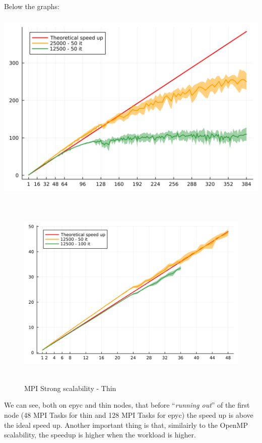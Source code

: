 \documentclass[
  letterpaper,
  DIV=11,
  numbers=noendperiod]{scrartcl}
\begin{document}
Below the graphs:

\includegraphics[width=\textwidth,height=3.64583in]{img/epyc_mpi_sockets.png}
\newpage

\begin{figure}

{\centering \includegraphics[width=\textwidth,height=3.64583in]{img/thin_mpi_sockets.png}

}

\caption{MPI Strong scalability - Thin}

\end{figure}

We can see, both on epyc and thin nodes, that before ``\emph{running
out}'' of the first node (48 MPI Tasks for thin and 128 MPI Tasks for
epyc) the speed up is above the ideal speed up. Another important thing
is that, similairly to the OpenMP scalability, the speedup is higher
when the workload is higher.
\end{document}
